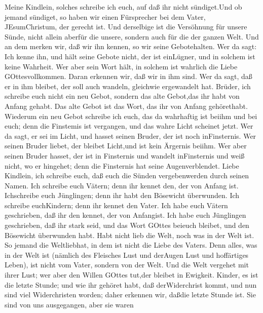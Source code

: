  Meine Kindlein, solches schreibe ich euch, auf daß ihr
nicht sündiget.Und ob jemand sündiget, so haben wir einen Fürsprecher
bei dem Vater, JEsumChristum, der gerecht ist.  Und
derselbige ist die Versöhnung für unsere Sünde, nicht allein aberfür die
unsere, sondern auch für die der ganzen Welt.  Und an dem
merken wir, daß wir ihn kennen, so wir seine Gebotehalten. 
Wer da sagt: Ich kenne ihn, und hält seine Gebote nicht, der ist
einLügner, und in solchem ist keine Wahrheit.  Wer aber sein
Wort hält, in solchem ist wahrlich die Liebe GOttesvollkommen. Daran
erkennen wir, daß wir in ihm sind.  Wer da sagt, daß er in
ihm bleibet, der soll auch wandeln, gleichwie ergewandelt hat.
 Brüder, ich schreibe euch nicht ein neu Gebot, sondern das
alte Gebot,das ihr habt von Anfang gehabt. Das alte Gebot ist das Wort,
das ihr von Anfang gehörethabt.  Wiederum ein neu Gebot
schreibe ich euch, das da wahrhaftig ist beiihm und bei euch; denn die
Finstemis ist vergangen, und das wahre Licht scheinet jetzt.
 Wer da sagt, er sei im Licht, und hasset seinen Bruder, der
ist noch inFinsternis.  Wer seinen Bruder liebet, der
bleibet Licht,und ist kein Ärgernis beiihm.  Wer aber
seinen Bruder hasset, der ist in Finsternis und wandelt inFinsternis und
weiß nicht, wo er hingehet; denn die Finsternis hat seine
Augenverblendet.  Liebe Kindlein, ich schreibe euch, daß
euch die Sünden vergebenwerden durch seinen Namen.  Ich
schreibe euch Vätern; denn ihr kennet den, der von Anfang ist.
Ichschreibe euch Jünglingen; denn ihr habt den Bösewicht überwunden. Ich
schreibe euchKindern; denn ihr kennet den Vater.  Ich habe
euch Vätern geschrieben, daß ihr den kennet, der von Anfangist. Ich habe
euch Jünglingen geschrieben, daß ihr stark seid, und das Wort GOttes
beieuch bleibet, und den Bösewicht überwunden habt.  Habt
nicht lieb die Welt, noch was in der Welt ist. So jemand die
Weltliebhat, in dem ist nicht die Liebe des Vaters.  Denn
alles, was in der Welt ist (nämlich des Fleisches Lust und derAugen Lust
und hoffärtiges Leben), ist nicht vom Vater, sondern von der Welt.
 Und die Welt vergehet mit ihrer Lust; wer aber den Willen
GOttes tut,der bleibet in Ewigkeit.  Kinder, es ist die
letzte Stunde; und wie ihr gehöret habt, daß derWiderchrist kommt, und
nun sind viel Widerchristen worden; daher erkennen wir, daßdie letzte
Stunde ist.  Sie sind von uns ausgegangen, aber sie waren
